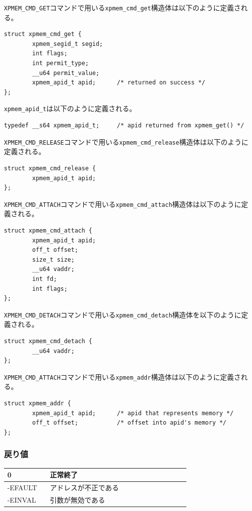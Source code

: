 \documentclass[twoside,11pt,fleqn]{book}
\begin{document}
\texttt{XPMEM\_CMD\_GET}コマンドで用いる\texttt{xpmem\_cmd\_get}構造体は以下のように定義される。
\begin{verbatim}
struct xpmem_cmd_get {
        xpmem_segid_t segid;
        int flags;
        int permit_type;
        __u64 permit_value;
        xpmem_apid_t apid;      /* returned on success */
};
\end{verbatim}

\texttt{xpmem\_apid\_t}は以下のように定義される。
\begin{verbatim}
typedef __s64 xpmem_apid_t;     /* apid returned from xpmem_get() */
\end{verbatim}

\texttt{XPMEM\_CMD\_RELEASE}コマンドで用いる\texttt{xpmem\_cmd\_release}構造体は以下のように定義される。
\begin{verbatim}
struct xpmem_cmd_release {
        xpmem_apid_t apid;
};
\end{verbatim}

\texttt{XPMEM\_CMD\_ATTACH}コマンドで用いる\texttt{xpmem\_cmd\_attach}構造体は以下のように定義される。
\begin{verbatim}
struct xpmem_cmd_attach {
        xpmem_apid_t apid;
        off_t offset;
        size_t size;
        __u64 vaddr;
        int fd;
        int flags;
};
\end{verbatim}

\texttt{XPMEM\_CMD\_DETACH}コマンドで用いる\texttt{xpmem\_cmd\_detach}構造体を以下のように定義される。
\begin{verbatim}
struct xpmem_cmd_detach {
        __u64 vaddr;
};
\end{verbatim}

\texttt{XPMEM\_CMD\_ATTACH}コマンドで用いる\texttt{xpmem\_addr}構造体は以下のように定義される。
\begin{verbatim}
struct xpmem_addr {
        xpmem_apid_t apid;      /* apid that represents memory */
        off_t offset;           /* offset into apid's memory */
};
\end{verbatim}

\subsubsection*{戻り値}{\quad}
\begin{table}[!h]
\footnotesize
\begin{tabular}{|p{0.20\linewidth}|p{0.66\linewidth}|} \hline
0&正常終了\\ \hline
-EFAULT&アドレスが不正である\\ \hline
-EINVAL&引数が無効である\\ \hline
\end{tabular}
\vspace{-0em}
\end{table}
\FloatBarrier
\end{document}
